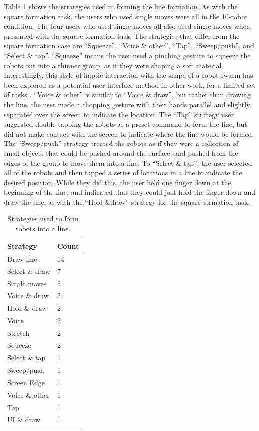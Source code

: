 Table \ref{tab:line_strategies} shows the strategies used in forming the line formation. 
As with the square formation task, the users who used single moves were all in the 10-robot condition. 
The four users who used single moves all also used single moves when presented with the square formation task. 
The strategies that differ from the square formation case are ``Squeeze'', ``Voice \& other'', ``Tap'', ``Sweep/push'', and ``Select \& tap''. 
``Squeeze'' means the user used a pinching gesture to squeeze the robots out into a thinner group, as if they were shaping a soft material. 
Interestingly, this style of haptic interaction with the shape of a robot swarm has been explored as a potential user interface method in other work, for a limited set of tasks \citep{mcdonald2017haptic}.
``Voice \& other'' is similar to ``Voice \& draw'', but rather than drawing the line, the user made a chopping gesture with their hands parallel and slightly separated over the screen to indicate the location. 
The ``Tap'' strategy user suggested double-tapping the robots as a preset command to form the line, but did not make contact with the screen to indicate where the line would be formed. 
The ``Sweep/push'' strategy treated the robots as if they were a collection of small objects that could be pushed around the surface, and pushed from the edges of the group to move them into a line. 
To ``Select \& tap'', the user selected all of the robots and then tapped a series of locations in a line to indicate the desired position.
While they did this, the user held one finger down at the beginning of the line, and indicated that they could just hold the finger down and draw the line, as with the ``Hold \&draw'' strategy for the square formation task. 

\begin{table}
	\begin{tabular}{l l}
		Strategy & Count\\
		\hline
		Draw line & 14\\
		Select \& draw & 7\\
		Single moves & 5\\
		Voice \& draw & 2\\
		Hold \& draw & 2\\
		Voice & 2\\
		Stretch & 2\\
		Squeeze & 2\\
		Select \& tap & 1 \\
		Sweep/push & 1\\
		Screen Edge & 1\\
		Voice \& other & 1\\
		Tap & 1 \\
		UI \& draw & 1\\
	\end{tabular}
	\caption{Strategies used to form robots into a line.}
	\label{tab:line_strategies}
\end{table}

